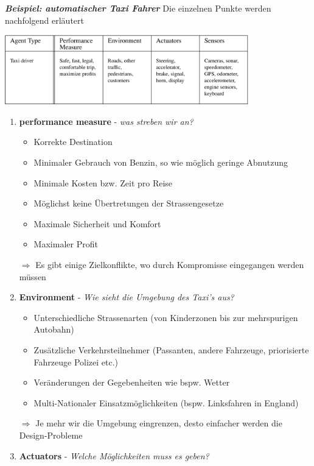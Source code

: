 \documentclass{article}
\newenvironment{Figure}
	{\par\medskip\noindent\minipage{\linewidth}}
	{\endminipage\par\medskip}
\theoremstyle{merke}
\theoremstyle{definition}
\begin{document}
\textbf{\textit{Beispiel: automatischer Taxi Fahrer}}
Die einzelnen Punkte werden nachfolgend erläutert
\begin{Figure}
\centering
\includegraphics[width=400px]{img/taskEnvironmentTaxi.png}
	\label{fig:PEAS Beschreibung}
\end{Figure}

\begin{enumerate}
\item \textbf{performance measure} - \textit{was streben wir an?}
\begin{itemize}
\item Korrekte Destination
\item Minimaler Gebrauch von Benzin, so wie möglich geringe Abnutzung
\item Minimale Kosten bzw. Zeit pro Reise
\item Möglichst keine Übertretungen der Strassengesetze 
\item Maximale Sicherheit und Komfort
\item Maximaler Profit
\end{itemize}
$\Rightarrow$ Es gibt einige Zielkonflikte, wo durch Kompromisse eingegangen werden müssen
\item \textbf{Environment} - \textit{Wie sieht die Umgebung des Taxi's aus?}
\begin{itemize}
\item Unterschiedliche Strassenarten (von Kinderzonen bis zur mehrspurigen Autobahn)
\item Zusätzliche Verkehrsteilnehmer (Passanten, andere Fahrzeuge, priorisierte Fahrzeuge Polizei etc.)
\item Veränderungen der Gegebenheiten wie bspw. Wetter
\item Multi-Nationaler Einsatzmöglichkeiten (bspw. Linksfahren in England)
\end{itemize}
$\Rightarrow$ Je mehr wir die Umgebung eingrenzen, desto einfacher werden die Design-Probleme
\item \textbf{Actuators} - \textit{Welche Möglichkeiten muss es geben?}
\begin{itemize}

\end{itemize}
\end{enumerate}
\end{document}

